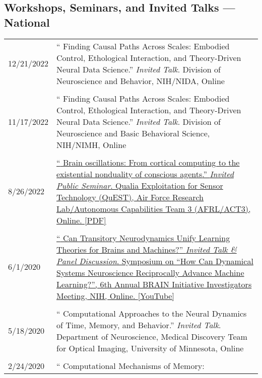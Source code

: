 \documentclass[10pt]{article}
\newcommand{\itemtitle}[1]{{\color{hopkinsblue}\ul{#1}}}
\newcommand{\unpubtitle}[1]{{\color{hopkinsblue} #1}}
\begin{document}
\subsection*{Workshops, Seminars, and Invited Talks --- National}
\label{talks:natl}

\begin{longtable}{@{\hspace{0.2in}}l>{\raggedright\arraybackslash}p{}}
  12/21/2022 \hspace{0.3in} & ``\unpubtitle{Finding Causal Paths Across Scales:
  Embodied Control, Ethological Interaction, and Theory-Driven Neural Data
  Science}.'' \emph{Invited Talk}. Division of Neuroscience and Behavior,
  NIH/NIDA, Online\\
  \tabularnewline
  11/17/2022 \hspace{0.3in} & ``\unpubtitle{Finding Causal Paths Across Scales:
  Embodied Control, Ethological Interaction, and Theory-Driven Neural Data
  Science}.'' \emph{Invited Talk}. Division of Neuroscience and Basic Behavioral
  Science, NIH/NIMH, Online\\
  \tabularnewline
  8/26/2022 \hspace{0.3in} &
  \href{https://jdmonaco.com/files/monaco-2022-afrl-quest-slides.pdf}
  {``\unpubtitle{Brain oscillations: From cortical computing to the existential
  nonduality of conscious agents}.'' \emph{Invited Public Seminar}. Qualia
  Exploitation for Sensor Technology (QuEST), Air Force Research Lab/Autonomous
  Capabilities Team 3 (AFRL/ACT3), Online. \itemtitle{[PDF]}}\\
  \tabularnewline
  6/1/2020 \hspace{0.3in} &
  \href{https://youtu.be/2jy1ENYHRAw?t=902}{``\unpubtitle{Can Transitory
  Neurodynamics Unify Learning Theories for Brains and Machines?}''
  \emph{Invited Talk \& Panel Discussion}. Symposium on ``How Can Dynamical
  Systems Neuroscience Reciprocally Advance Machine Learning?'', 6th Annual
  BRAIN Initiative Investigators Meeting, NIH, Online. \itemtitle{[YouTube]}}\\
  \tabularnewline
  5/18/2020 \hspace{0.3in} & ``\unpubtitle{Computational Approaches to the
  Neural Dynamics of Time, Memory, and Behavior}.'' \emph{Invited Talk}.
  Department of Neuroscience, Medical Discovery Team for Optical Imaging,
  University of Minnesota, Online\\
  \tabularnewline
  2/24/2020 \hspace{0.3in} & ``\unpubtitle{Computational Mechanisms of Memory:
}
\end{longtable}
\end{document}
